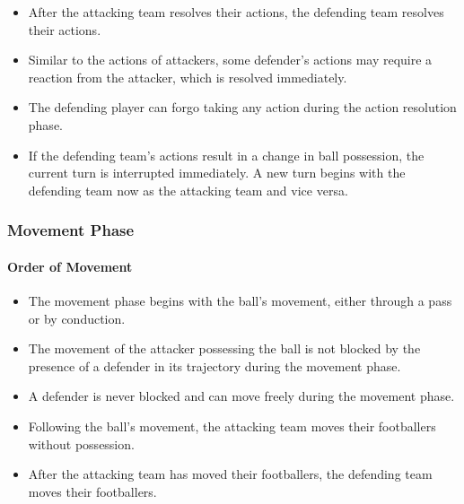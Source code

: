 \documentclass[12pt]{article}
\begin{document}
\begin{rulebox}
\begin{itemize}
\item After the attacking team resolves their actions, the defending team resolves their actions.
\item Similar to the actions of attackers, some defender's actions may require a reaction from the attacker, which is resolved immediately.
\item The defending player can forgo taking any action during the action resolution phase.
\end{itemize}
\end{rulebox}

\begin{specialcase}
\begin{itemize}
\item If the defending team's actions result in a change in ball possession, the current turn is interrupted immediately. A new turn begins with the defending team now as the attacking team and vice versa.
\end{itemize}
\end{specialcase}

\subsubsection{Movement Phase}

\paragraph{Order of Movement}

\begin{rulebox}
\begin{itemize}
\item The movement phase begins with the ball's movement, either through a pass or by conduction.
\item The movement of the attacker possessing the ball is not blocked by the presence of a defender in its trajectory during the movement phase.
\item A defender is never blocked and can move freely during the movement phase.
\item Following the ball's movement, the attacking team moves their footballers without possession.
\item After the attacking team has moved their footballers, the defending team moves their footballers.
\end{itemize}
\end{rulebox}
\end{document}
